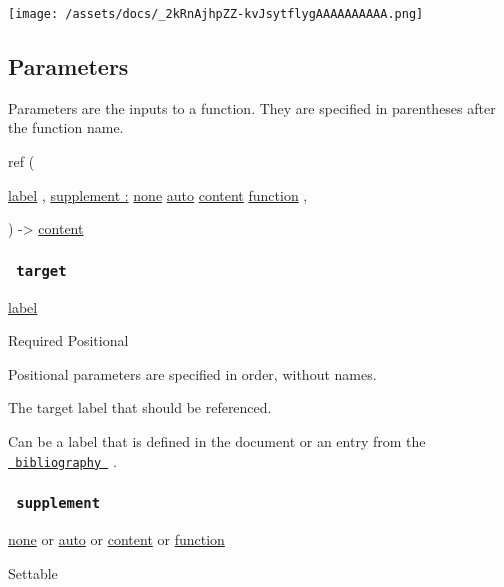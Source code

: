 \texttt{[image: /assets/docs/\_2kRnAjhpZZ-kvJsytflygAAAAAAAAAA.png]}

\subsection{\texorpdfstring{{ Parameters
}}{ Parameters }}\label{parameters}

\label{parameters-tooltip}
Parameters are the inputs to a function. They are specified in
parentheses after the function name.

{ ref } (

{ \href{/docs/reference/foundations/label/}{label} , } {
\hyperref[parameters-supplement]{supplement :}
\href{/docs/reference/foundations/none/}{none}
\href{/docs/reference/foundations/auto/}{auto}
\href{/docs/reference/foundations/content/}{content}
\href{/docs/reference/foundations/function/}{function} , }

) -\textgreater{} \href{/docs/reference/foundations/content/}{content}

\subsubsection{\texorpdfstring{\texttt{\ target\ }}{ target }}\label{parameters-target}

\href{/docs/reference/foundations/label/}{label}

{Required} {{ Positional }}

\label{parameters-target-positional-tooltip}
Positional parameters are specified in order, without names.

The target label that should be referenced.

Can be a label that is defined in the document or an entry from the
\href{/docs/reference/model/bibliography/}{\texttt{\ bibliography\ }} .

\subsubsection{\texorpdfstring{\texttt{\ supplement\ }}{ supplement }}\label{parameters-supplement}

\href{/docs/reference/foundations/none/}{none} {or}
\href{/docs/reference/foundations/auto/}{auto} {or}
\href{/docs/reference/foundations/content/}{content} {or}
\href{/docs/reference/foundations/function/}{function}

{{ Settable }}


